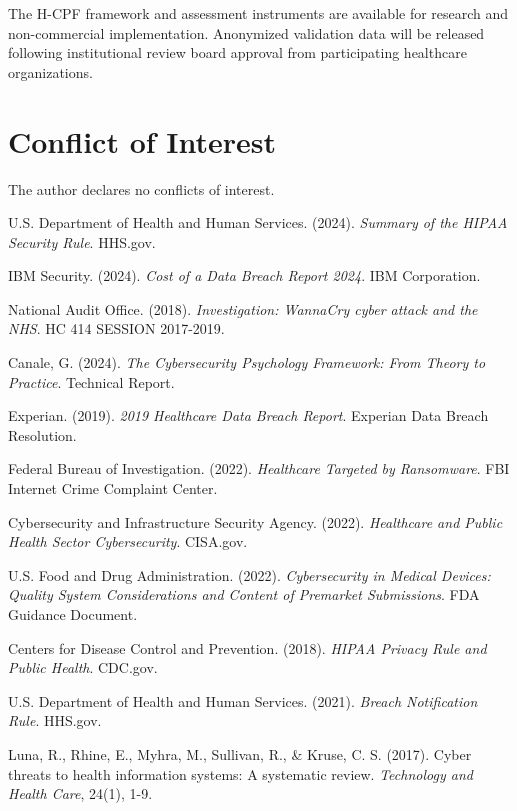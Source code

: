\documentclass[10pt, twocolumn]{article}
\begin{document}
The H-CPF framework and assessment instruments are available for research and non-commercial implementation. Anonymized validation data will be released following institutional review board approval from participating healthcare organizations.

\section*{Conflict of Interest}

The author declares no conflicts of interest.

\begin{thebibliography}{99}

U.S. Department of Health and Human Services. (2024). \textit{Summary of the HIPAA Security Rule}. HHS.gov.

IBM Security. (2024). \textit{Cost of a Data Breach Report 2024}. IBM Corporation.

National Audit Office. (2018). \textit{Investigation: WannaCry cyber attack and the NHS}. HC 414 SESSION 2017-2019.

Canale, G. (2024). \textit{The Cybersecurity Psychology Framework: From Theory to Practice}. Technical Report.

Experian. (2019). \textit{2019 Healthcare Data Breach Report}. Experian Data Breach Resolution.

Federal Bureau of Investigation. (2022). \textit{Healthcare Targeted by Ransomware}. FBI Internet Crime Complaint Center.

Cybersecurity and Infrastructure Security Agency. (2022). \textit{Healthcare and Public Health Sector Cybersecurity}. CISA.gov.

U.S. Food and Drug Administration. (2022). \textit{Cybersecurity in Medical Devices: Quality System Considerations and Content of Premarket Submissions}. FDA Guidance Document.

Centers for Disease Control and Prevention. (2018). \textit{HIPAA Privacy Rule and Public Health}. CDC.gov.

U.S. Department of Health and Human Services. (2021). \textit{Breach Notification Rule}. HHS.gov.

Luna, R., Rhine, E., Myhra, M., Sullivan, R., \& Kruse, C. S. (2017). Cyber threats to health information systems: A systematic review. \textit{Technology and Health Care}, 24(1), 1-9.


\end{thebibliography}
\end{document}
